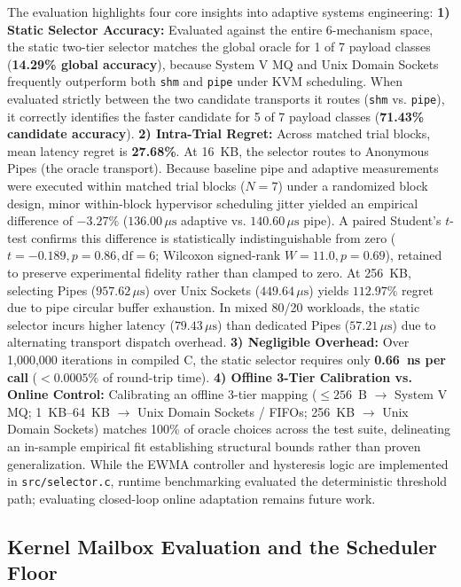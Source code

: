 The evaluation highlights four core insights into adaptive systems engineering:
\textbf{1) Static Selector Accuracy:} Evaluated against the entire 6-mechanism space, the static two-tier selector matches the global oracle for 1 of 7 payload classes (\textbf{14.29\% global accuracy}), because System V MQ and Unix Domain Sockets frequently outperform both \texttt{shm} and \texttt{pipe} under KVM scheduling. When evaluated strictly between the two candidate transports it routes (\texttt{shm} vs. \texttt{pipe}), it correctly identifies the faster candidate for 5 of 7 payload classes (\textbf{71.43\% candidate accuracy}).
\textbf{2) Intra-Trial Regret:} Across matched trial blocks, mean latency regret is \textbf{27.68\%}. At 16~KB, the selector routes to Anonymous Pipes (the oracle transport). Because baseline pipe and adaptive measurements were executed within matched trial blocks ($N=7$) under a randomized block design, minor within-block hypervisor scheduling jitter yielded an empirical difference of $-3.27\%$ ($136.00\,\mu\text{s}$ adaptive vs. $140.60\,\mu\text{s}$ pipe). A paired Student's $t$-test confirms this difference is statistically indistinguishable from zero ($t = -0.189, p = 0.86, \text{df} = 6$; Wilcoxon signed-rank $W = 11.0, p = 0.69$), retained to preserve experimental fidelity rather than clamped to zero. At 256~KB, selecting Pipes ($957.62\,\mu\text{s}$) over Unix Sockets ($449.64\,\mu\text{s}$) yields $112.97\%$ regret due to pipe circular buffer exhaustion. In mixed 80/20 workloads, the static selector incurs higher latency ($79.43\,\mu\text{s}$) than dedicated Pipes ($57.21\,\mu\text{s}$) due to alternating transport dispatch overhead.
\textbf{3) Negligible Overhead:} Over 1,000,000 iterations in compiled C, the static selector requires only \textbf{0.66~ns per call} ($< 0.0005\%$ of round-trip time).
\textbf{4) Offline 3-Tier Calibration vs. Online Control:} Calibrating an offline 3-tier mapping ($\le 256$~B $\to$ System V MQ; 1~KB--64~KB $\to$ Unix Domain Sockets / FIFOs; 256~KB $\to$ Unix Domain Sockets) matches 100\% of oracle choices across the test suite, delineating an in-sample empirical fit establishing structural bounds rather than proven generalization. While the EWMA controller and hysteresis logic are implemented in \texttt{src/selector.c}, runtime benchmarking evaluated the deterministic threshold path; evaluating closed-loop online adaptation remains future work.

\subsection{Kernel Mailbox Evaluation and the Scheduler Floor}

